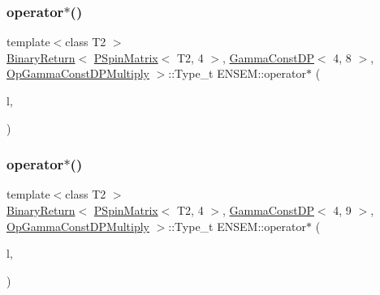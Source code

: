 \subsubsection{\texorpdfstring{operator$\ast$()}{operator*()}\hspace{0.1cm}{\footnotesize\ttfamily [57/64]}}
{\footnotesize\ttfamily template$<$class T2 $>$ \\
\mbox{\hyperlink{structENSEM_1_1BinaryReturn}{Binary\+Return}}$<$ \mbox{\hyperlink{classENSEM_1_1PSpinMatrix}{P\+Spin\+Matrix}}$<$ T2, 4 $>$, \mbox{\hyperlink{classENSEM_1_1GammaConstDP}{Gamma\+Const\+DP}}$<$ 4, 8 $>$, \mbox{\hyperlink{structENSEM_1_1OpGammaConstDPMultiply}{Op\+Gamma\+Const\+D\+P\+Multiply}} $>$\+::Type\+\_\+t E\+N\+S\+E\+M\+::operator$\ast$ (\begin{DoxyParamCaption}\item[{const \mbox{\hyperlink{classENSEM_1_1PSpinMatrix}{P\+Spin\+Matrix}}$<$ T2, 4 $>$ \&}]{l,  }\item[{const \mbox{\hyperlink{classENSEM_1_1GammaConstDP}{Gamma\+Const\+DP}}$<$ 4, 8 $>$ \&}]{ }\end{DoxyParamCaption})\hspace{0.3cm}{\ttfamily [inline]}}

\mbox{\label{group__primspinmatrix_ga49c2bb9929a1c38be010fe8c661f3720}} 
\subsubsection{\texorpdfstring{operator$\ast$()}{operator*()}\hspace{0.1cm}{\footnotesize\ttfamily [58/64]}}
{\footnotesize\ttfamily template$<$class T2 $>$ \\
\mbox{\hyperlink{structENSEM_1_1BinaryReturn}{Binary\+Return}}$<$ \mbox{\hyperlink{classENSEM_1_1PSpinMatrix}{P\+Spin\+Matrix}}$<$ T2, 4 $>$, \mbox{\hyperlink{classENSEM_1_1GammaConstDP}{Gamma\+Const\+DP}}$<$ 4, 9 $>$, \mbox{\hyperlink{structENSEM_1_1OpGammaConstDPMultiply}{Op\+Gamma\+Const\+D\+P\+Multiply}} $>$\+::Type\+\_\+t E\+N\+S\+E\+M\+::operator$\ast$ (\begin{DoxyParamCaption}\item[{const \mbox{\hyperlink{classENSEM_1_1PSpinMatrix}{P\+Spin\+Matrix}}$<$ T2, 4 $>$ \&}]{l,  }\item[{const \mbox{\hyperlink{classENSEM_1_1GammaConstDP}{Gamma\+Const\+DP}}$<$ 4, 9 $>$ \&}]{ }\end{DoxyParamCaption})\hspace{0.3cm}{\ttfamily [inline]}}

